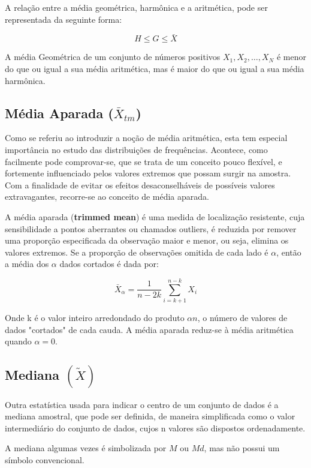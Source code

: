 A relação entre a média geométrica, harmônica e a aritmética, pode ser representada da seguinte forma:

        $$ H \leq G \leq \bar{X}  $$

A média Geométrica de um conjunto de números positivos $X_{1},X_{2},\ldots,X_{N}$ é menor do que ou igual a sua média aritmética, mas é maior do que ou igual a sua média harmônica.


\subsection{Média Aparada ($\bar{X}_{tm}$)}


\inic Como se referiu ao introduzir a noção de média aritmética, esta tem especial
importância no estudo das distribuições de frequências.
Acontece, como facilmente pode comprovar-se, que se trata de um conceito
pouco flexível, e fortemente influenciado pelos valores extremos que possam surgir na
amostra. Com a finalidade de evitar os efeitos desaconselháveis de possíveis valores
extravagantes, recorre-se ao conceito de média aparada. \vskip0.3cm


A média aparada (\textbf{trimmed mean}) é uma medida de localização resistente, cuja sensibilidade a pontos aberrantes ou chamados outliers, é reduzida por remover uma proporção especificada da observação maior e menor, ou seja, elimina os valores extremos. Se a proporção de observações omitida de cada lado é $\alpha$, então a média dos $\alpha$ dados cortados é dada por:

\begin{equation}\label{aparada}
    \bar{X}_{\alpha}=\frac{1}{n-2k}\sum_{i=k+1}^{n-k}X_{i}
\end{equation}

Onde k é o valor inteiro arredondado do produto $\alpha n$, o número de valores de dados "cortados" de cada cauda. A média aparada reduz-se à média aritmética quando $\alpha = 0$.


\subsection{Mediana $(\widetilde{X})$}


\inic Outra estatística usada para indicar o centro de um conjunto de dados é a mediana amostral, que pode ser definida, de maneira simplificada como o valor intermediário do conjunto de dados, cujos n valores são dispostos ordenadamente.\vskip0.3cm


A mediana algumas vezes é simbolizada por $M$ ou $Md$, mas não possui um símbolo convencional.\vskip0.3cm



